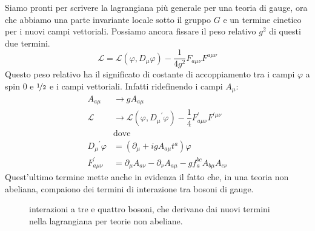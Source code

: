 \documentclass[italian,a4paper]{article}
\theoremstyle{definition}
\newcommand{\lagr}{\ensuremath{\mathscr{L}}}
\newcommand{\dimu}{\ensuremath{\partial_{\mu}}}
\newcommand{\Dimu}{\ensuremath{D_{\mu}}}
\newcommand{\dinu}{\ensuremath{\partial_{\nu}}}
\begin{document}
Siamo pronti per scrivere la lagrangiana pi\`u generale per una teoria di
gauge, ora che abbiamo una parte invariante locale sotto il gruppo $G$ e un
termine cinetico per i nuovi campi vettoriali. Possiamo ancora fissare il
peso relativo $g^{2}$ di questi due termini.
\begin{equation*}
    \lagr = \lagr(\varphi, \Dimu \varphi) -
    \dfrac{1}{4g^2}F_{a\mu\nu}F^{a\mu\nu}
\end{equation*}
Questo peso relativo ha il significato di costante di accoppiamento tra i
campi $\varphi$ a spin $0$ e $\nicefrac{1}{2}$ e i campi vettoriali. Infatti
ridefinendo i campi $A_\mu$:
\begin{align*}
    A_{a\mu} &\longrightarrow g A_{a\mu}\\
    \lagr & \longrightarrow \lagr(\varphi, \Dimu^\prime\varphi) -
    \dfrac{1}{4}F^\prime_{a\mu\nu}F^{\prime\mu\nu}\\
    &\text{dove}\\
    \Dimu^\prime\varphi &= (\dimu + i g A_{a\mu} t^{a})\varphi\\
    F^\prime_{a\mu\nu} &= \dimu A_{a\nu} - \dinu A_{a\mu} - gf^{bc}_a
    A_{b\mu}A_{c\nu}
\end{align*}
Quest'ultimo termine mette anche in evidenza il fatto che, in una teoria non
abeliana, compaiono dei termini di interazione tra bosoni di gauge.
\begin{figure}[h]
    \begin{center}
        
        
    \end{center}
    \caption{interazioni a tre e quattro bosoni, che derivano dai nuovi
    termini nella lagrangiana per teorie non abeliane.}
    \label{fig:3bos}
\end{figure}
\end{document}

